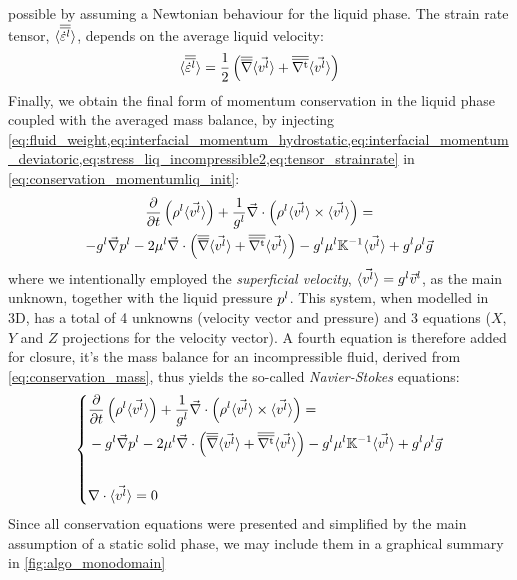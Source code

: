 possible by assuming a Newtonian behaviour for the liquid phase. The strain rate tensor, $\langle {\overline{\overline{\dot{\varepsilon}^l}}} \rangle$, depends on 
the average liquid velocity:
\begin{align}
\label{eq:tensor_strainrate}
\langle {\overline{\overline{\dot{\varepsilon}^l}}} \rangle = \frac{1}{2} \left( {\overline{\overline{\nabla}}} \langle \vec{v^l} \rangle  +  {\overline{\overline{\nabla^\text{t}}}} \langle \vec{v^l} \rangle \right)
\end{align}
Finally, we obtain the final form of momentum conservation in the liquid phase coupled with the averaged mass balance, by injecting \cref{eq:fluid_weight,eq:interfacial_momentum_hydrostatic,eq:interfacial_momentum_deviatoric,eq:stress_liq_incompressible2,eq:tensor_strainrate}
in \cref{eq:conservation_momentumliq_init}:
\begin{multline}
\label{eq:conservation_momentumliq}
 \frac{\partial}{\partial t} \left(  \rho^l \langle \vec{v^l} \rangle  \right)  + \frac{1}{{g^l}} \vec{\nabla} \cdot \left( \rho^l \langle \vec{v^l} \rangle \times \langle \vec{v^l} \rangle \right) = \\
	  - {g^l}\vec{\nabla} {p^l} - 2 \mu^l \vec{\nabla} \cdot \left( {\overline{\overline{\nabla}}} \langle \vec{v^l} \rangle + {\overline{\overline{\nabla^\text{t}}}} \langle \vec{v^l} \rangle \right)
	  - {g^l} \mu^l \mathbb{K}^{-1} \langle \vec{v^l} \rangle + {g^l} \rho^l \vec{g}
\end{multline}
where we intentionally employed the \emph{superficial velocity}, $\langle \vec{v^l} \rangle = {g^l} \vec{v}^l$, as the main unknown, together with the liquid pressure ${p^l}$.
This system, when modelled in 3D, has a total of 4 unknowns (velocity vector and pressure) and 3 equations ($X$,$Y$ and $Z$ projections for the velocity vector).
A fourth equation is therefore added for closure, it's the mass balance for an incompressible fluid, derived from \cref{eq:conservation_mass}, 
thus yields the so-called \emph{Navier-Stokes} equations:
\begin{equation}
   \left\{
   \begin{aligned}
      & \frac{\partial}{\partial t} \left(  \rho^l \langle \vec{v^l} \rangle  \right)  + \frac{1}{{g^l}} \vec{\nabla} \cdot \left( \rho^l \langle \vec{v^l} \rangle \times \langle \vec{v^l} \rangle \right) = \\
	  &- {g^l}\vec{\nabla} {p^l} - 2 \mu^l \vec{\nabla} \cdot \left( {\overline{\overline{\nabla}}} \langle \vec{v^l} \rangle + {\overline{\overline{\nabla^\text{t}}}} \langle \vec{v^l} \rangle \right)
	  - {g^l} \mu^l \mathbb{K}^{-1} \langle \vec{v^l} \rangle + {g^l} \rho^l \vec{g}\\ \\
      & \nabla \cdot \langle \vec{v^l} \rangle =0
    \end{aligned}
    \right.
\end{equation}
Since all conservation equations were presented and simplified by the main assumption of a static solid phase, 
we may include them in a graphical summary in \cref{fig:algo_monodomain}
